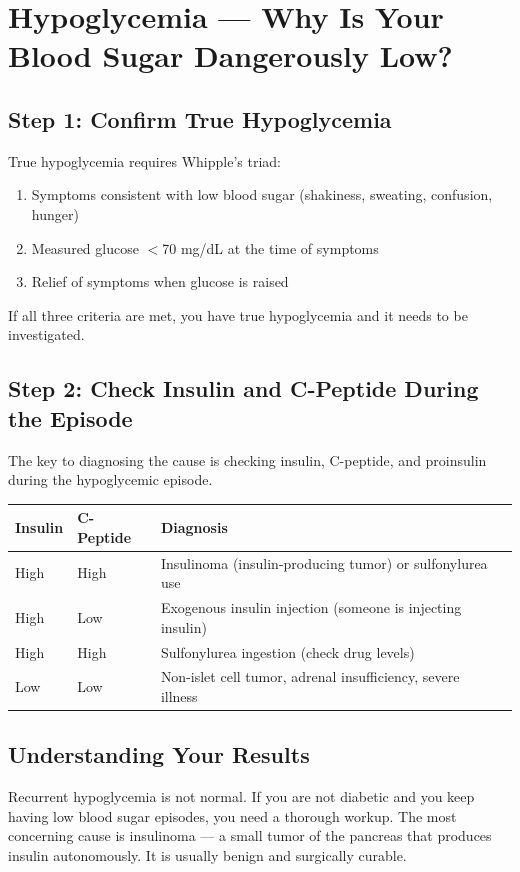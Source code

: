 \clearpage
\section{Hypoglycemia --- Why Is Your Blood Sugar Dangerously Low?}

\subsection{Step 1: Confirm True Hypoglycemia}

True hypoglycemia requires Whipple's triad:
\begin{enumerate}
    \item Symptoms consistent with low blood sugar (shakiness, sweating, confusion, hunger)
    \item Measured glucose $<$70 mg/dL at the time of symptoms
    \item Relief of symptoms when glucose is raised
\end{enumerate}

If all three criteria are met, you have true hypoglycemia and it needs to be investigated.

\subsection{Step 2: Check Insulin and C-Peptide During the Episode}

The key to diagnosing the cause is checking insulin, C-peptide, and proinsulin during the hypoglycemic episode.

\begin{longtable}{@{}llll@{}}
\toprule
\textbf{Insulin} & \textbf{C-Peptide} & \textbf{Diagnosis} \\
\midrule
High & High & Insulinoma (insulin-producing tumor) or sulfonylurea use \\
High & Low & Exogenous insulin injection (someone is injecting insulin) \\
High & High & Sulfonylurea ingestion (check drug levels) \\
Low & Low & Non-islet cell tumor, adrenal insufficiency, severe illness \\
\bottomrule
\end{longtable}

\subsection{Understanding Your Results}

Recurrent hypoglycemia is not normal. If you are not diabetic and you keep having low blood sugar episodes, you need a thorough workup. The most concerning cause is insulinoma --- a small tumor of the pancreas that produces insulin autonomously. It is usually benign and surgically curable.

